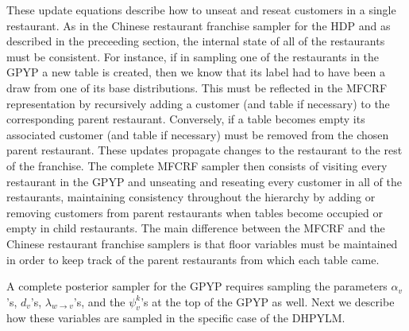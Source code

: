 \documentclass{article}
\newcommand{\comment}[1]{}
\begin{document}
These update equations describe how to unseat and reseat customers in a single restaurant.  As in the Chinese restaurant franchise sampler for the HDP \citep{TehJorBea2006} and as described in the preceeding section, the internal state of all of the restaurants must be consistent.  For instance, if in sampling one of the restaurants in the GPYP a new table is created, then we know that its label had to have been a draw from one of its base distributions.  This must be reflected in the MFCRF representation by recursively adding a customer (and table if necessary) to the corresponding parent restaurant.  Conversely, if a table becomes empty its associated customer (and table if necessary) must be removed from the chosen parent restaurant.  These updates propagate changes to the restaurant to the rest of the franchise.  The complete MFCRF sampler then consists of visiting every restaurant in the GPYP and unseating and reseating every customer in all of the restaurants, maintaining consistency throughout the hierarchy by adding or removing customers from parent restaurants when tables become occupied or empty in child restaurants.  The main difference between the MFCRF and the Chinese restaurant franchise samplers is that floor variables must be maintained in order to keep track of the parent restaurants from which each table came.


\comment{When a new table is chosen, the corresponding draws $s_v^k \sim \Lambda_v$ and $\phi_v^k \sim \mathcal{G}_{s_v^k}$ from the mixture base distribution are used to form the new table label.}  

A complete posterior sampler for the GPYP requires sampling the parameters $\alpha_v$'s, $d_v$'s, $\lambda_{w\rightarrow v}$'s, and the $\psi_v^k$'s at the top of the GPYP as well. \comment{; different approaches for sampling each of these variables will be required for different GPYP architectures.}  Next we describe how these variables are sampled in the specific case of the DHPYLM. 
\end{document}
